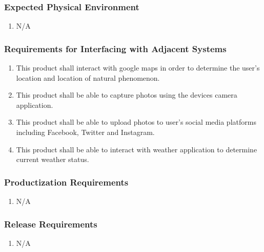 \documentclass[]{article}
\begin{document}
\subsubsection{Expected Physical Environment}
\label{ssub:expected_physical_environment}
\begin{enumerate}[{OE}1. ]
	\item N/A
\end{enumerate}

\subsubsection{Requirements for Interfacing with Adjacent Systems}
\label{ssub:requirements_for_interfacing_with_adjacent_systems}
\begin{enumerate}[{OE}1. ]
	\item This product shall interact with google maps in order to determine the user's location and location of natural phenomenon.
	\item This product shall be able to capture photos using the devices camera application.
	\item This product shall be able to upload photos to user's social media platforms including Facebook, Twitter and Instagram.
	\item This product shall be able to interact with weather application to determine current weather status. %
\end{enumerate}

\subsubsection{Productization Requirements}
\label{ssub:productization_requirements}
\begin{enumerate}[{OE}1. ]
	\item N/A %
\end{enumerate}

\subsubsection{Release Requirements}
\label{ssub:release_requirements}
\begin{enumerate}[{OE}1. ]
	\item N/A %
\end{enumerate}
\end{document}
